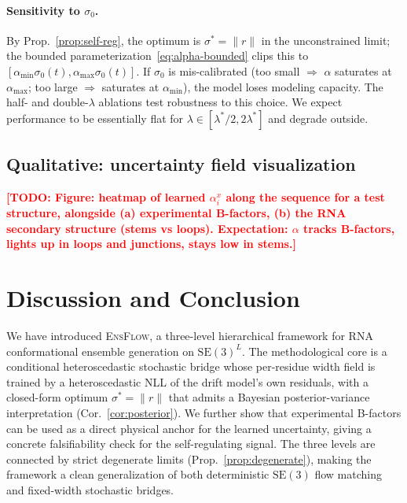 \documentclass{article}
\theoremstyle{remark}
\theoremstyle{definition}
\newcommand{\SE}{\mathrm{SE}}
\newcommand{\todo}[1]{\textcolor{red}{\textbf{[TODO: #1]}}}
\begin{document}
\paragraph{Sensitivity to $\sigma_0$.}
By Prop.~\ref{prop:self-reg}, the optimum is $\sigma^{\ast}=\|r\|$ in the
unconstrained limit; the bounded parameterization~\eqref{eq:alpha-bounded}
clips this to $[\alpha_{\min}\sigma_0(t),\alpha_{\max}\sigma_0(t)]$. If
$\sigma_0$ is mis-calibrated (too small $\Rightarrow$ $\alpha$ saturates at
$\alpha_{\max}$; too large $\Rightarrow$ saturates at $\alpha_{\min}$), the
model loses modeling capacity. The half- and double-$\lambda$ ablations test
robustness to this choice. We expect performance to be essentially flat for
$\lambda\in[\lambda^{\ast}/2,2\lambda^{\ast}]$ and degrade outside.

\subsection{Qualitative: uncertainty field visualization}
\label{subsec:exp-qual}

\todo{Figure: heatmap of learned $\alpha^x_i$ along the sequence for a test
structure, alongside (a) experimental B-factors, (b) the RNA secondary
structure (stems vs loops). Expectation: $\alpha$ tracks B-factors, lights up
in loops and junctions, stays low in stems.}

\section{Discussion and Conclusion}
\label{sec:conclusion}

We have introduced \textsc{EnsFlow}, a three-level hierarchical framework for
RNA conformational ensemble generation on $\SE(3)^L$. The methodological core
is a conditional heteroscedastic stochastic bridge whose per-residue width
field is trained by a heteroscedastic NLL of the drift model's own residuals,
with a closed-form optimum $\sigma^{\ast}=\|r\|$ that admits a Bayesian
posterior-variance interpretation (Cor.~\ref{cor:posterior}). We further show
that experimental B-factors can be used as a direct physical anchor for the
learned uncertainty, giving a concrete falsifiability check for the
self-regulating signal. The three levels are connected by strict degenerate
limits (Prop.~\ref{prop:degenerate}), making the framework a clean
generalization of both deterministic $\SE(3)$ flow matching and fixed-width
stochastic bridges.
\end{document}
